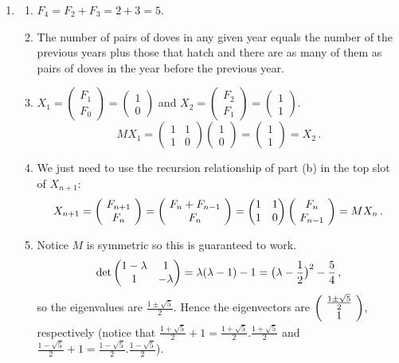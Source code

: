 \begin{enumerate}
\item 
\begin{enumerate}
\item $F_4=F_2+F_3=2+3=5$.
\item The number of pairs of doves in any given year equals the number of the previous years plus those that hatch and there are as many of them as pairs of doves in the year before the previous year.
\item $X_1=\begin{pmatrix}F_1\\F_0\end{pmatrix}=\begin{pmatrix}1\\0\end{pmatrix}$
and $X_2=\begin{pmatrix}F_2\\F_1\end{pmatrix}=\begin{pmatrix}1\\1\end{pmatrix}$.
\[
MX_1=\begin{pmatrix}1 & 1\\ 1& 0\end{pmatrix}\begin{pmatrix}1\\ 0\end{pmatrix}
=\begin{pmatrix}1\\1\end{pmatrix}=X_2\, .
\]
\item We just need to use the recursion relationship of part (b) in the top slot of $X_{n+1}$:
\[
X_{n+1}=\left(\!\begin{array}{c} F_{n+1}\\F_n \end{array}\!\right)
=\left(\!\begin{array}{c} F_{n}+F_{n-1}\\F_n \end{array}\!\right)=
\begin{pmatrix}1 & 1\\ 1& 0\end{pmatrix}\left(\!\begin{array}{c} F_{n}\\F_{n-1} \end{array}\!\right)=M X_n\, .
\]
\item Notice $M$ is symmetric so this is guaranteed to work. \[\det \begin{pmatrix}1-\lambda&\mc1\\\mc1&-\lambda\end{pmatrix}=\lambda(\lambda-1)-1=\big(\lambda-\frac12\big)^2-\frac54\, ,\]
so the eigenvalues are $\frac{1\pm\sqrt{5}}{2}$. Hence the eigenvectors are $\left(\!\begin{array}{c} \frac{1\pm\sqrt{5}}{2}\\1 \end{array}\!\right)$, respectively (notice that $\frac{1+\sqrt{5}}{2}+1=\frac{1+\sqrt{5}}{2}.\frac{1+\sqrt{5}}{2}$ and $\frac{1-\sqrt{5}}{2}+1=\frac{1-\sqrt{5}}{2}.\frac{1-\sqrt{5}}{2}$).

\end{enumerate}
\end{enumerate}
